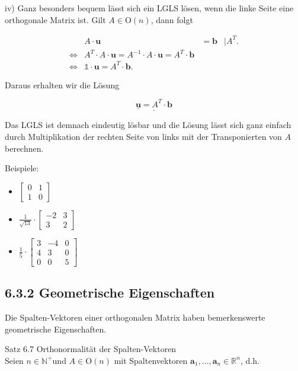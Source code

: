 \documentclass[10pt]{article}
\begin{document}
iv) Ganz besonders bequem lässt sich ein LGLS lösen, wenn die linke Seite eine orthogonale Matrix ist. Gilt $A \in \mathrm{O}(n)$, dann folgt

\[
\begin{array}{rlrl} 
& A \cdot \mathbf{u} & =\mathbf{b} & \mid A^{T} . \\
\Leftrightarrow & A^{T} \cdot A \cdot \mathbf{u}=A^{-1} \cdot A \cdot \mathbf{u}=A^{T} \cdot \mathbf{b} & \\
\Leftrightarrow & \mathbb{1} \cdot \mathbf{u}=A^{T} \cdot \mathbf{b} . & \tag{6.59}
\end{array}
\]

Daraus erhalten wir die Lösung


\begin{equation*}
\underline{\underline{\mathbf{u}}=A^{T} \cdot \mathbf{b}} \tag{6.60}
\end{equation*}


Das LGLS ist demnach eindeutig lösbar und die Lösung lässt sich ganz einfach durch Multiplikation der rechten Seite von links mit der Transponierten von $A$ berechnen.

Beispiele:

\begin{itemize}
  \item $\left[\begin{array}{ll}0 & 1 \\ 1 & 0\end{array}\right]$
  \item $\frac{1}{\sqrt{13}} \cdot\left[\begin{array}{rr}-2 & 3 \\ 3 & 2\end{array}\right]$
  \item $\frac{1}{5} \cdot\left[\begin{array}{rrr}3 & -4 & 0 \\ 4 & 3 & 0 \\ 0 & 0 & 5\end{array}\right]$
\end{itemize}

\subsection*{6.3.2 Geometrische Eigenschaften}
Die Spalten-Vektoren einer orthogonalen Matrix haben bemerkenswerte geometrische Eigenschaften.

Satz 6.7 Orthonormalität der Spalten-Vektoren\\
Seien $n \in \mathbb{N}^{+}$und $A \in \mathrm{O}(n)$ mit Spaltenvektoren $\mathbf{a}_{1}, \ldots, \mathbf{a}_{n} \in \mathbb{R}^{n}$, d.h.
\end{document}
